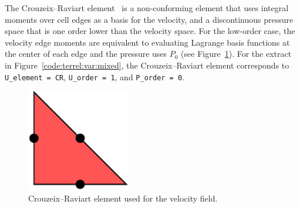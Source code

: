 The Crouzeix--Raviart element~\citep{CrouzeixRaviart1973} is a
non-conforming element that uses integral moments over cell edges as
a basis for the velocity, and a discontinuous pressure space that is
one order lower than the velocity space.  For the low-order case,
the velocity edge moments are equivalent to evaluating Lagrange
basis functions at the center of each edge and the pressure uses
$P_0$ (see Figure~\ref{fig:terrel:CRElements}).  For the extract
in Figure~\ref{code:terrel:var:mixed}, the Crouzeix--Raviart element
corresponds to {\tt U\_element = CR}, {\tt U\_order = 1},  and {\tt P\_order = 0}.
%
\begin{figure}
  \center
  \includegraphics[width=0.4\textwidth]{chapters/kirby-6/pdf/CR1.pdf}
  \caption{Crouzeix--Raviart element used for the velocity field.}
  \label{fig:terrel:CRElements}
\end{figure}

